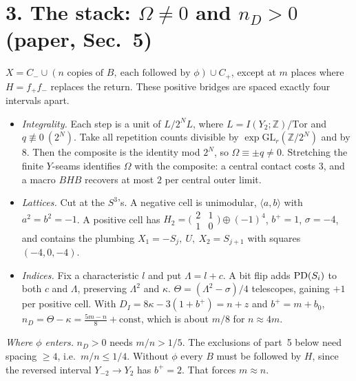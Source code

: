 \documentclass[10pt]{amsart}
\newcommand{\Z}{\mathbb Z}\newcommand{\Q}{\mathbb Q}\newcommand{\F}{\mathbb F}
\begin{document}
\section*{3. The stack: $\Omega\ne0$ and $n_D>0$ (paper, Sec.~5)}
$X=C_-\cup(\text{$n$ copies of }B,\ \text{each followed by }\phi)\cup C_+$,
except at $m$ places where $H=f_+f_-$ replaces the return. These positive
bridges are spaced exactly four intervals apart.
\begin{itemize}
\item \emph{Integrality.} Each step is a unit of $L/2^NL$, where
$L=I(Y_2;\Z)/\mathrm{Tor}$ and $q\not\equiv0\ (2^N)$. Take all repetition
counts divisible by $\exp\mathrm{GL}_r(\Z/2^N)$ and by $8$. Then the composite
is the identity mod $2^N$, so $\Omega\equiv\pm q\ne0$. Stretching the finite
$Y$-seams identifies $\Omega$ with the composite: a central contact costs
$3$, and a macro $BHB$ recovers at most $2$ per central outer limit.
\item \emph{Lattices.} Cut at the $S^3$'s. A negative cell is unimodular,
$\langle a,b\rangle$ with $a^2=b^2=-1$. A positive cell has
$H_2=\bigl(\begin{smallmatrix}2&1\\1&0\end{smallmatrix}\bigr)\oplus(-1)^4$,
$b^+=1$, $\sigma=-4$, and contains the plumbing
$X_1=-S_j,\ U,\ X_2=S_{j+1}$ with squares $(-4,0,-4)$.
\item \emph{Indices.} Fix a characteristic $l$ and put $\Lambda=l+c$. A bit
flip adds $\operatorname{PD}(S_i)$ to both $c$ and $\Lambda$, preserving $\Lambda^2$ and
$\kappa$. $\Theta=(\Lambda^2-\sigma)/4$ telescopes, gaining $+1$ per positive
cell. With $D_I=8\kappa-3(1+b^+)=n+z$ and $b^+=m+b_0$,
$n_D=\Theta-\kappa=\frac{5m-n}{8}+\mathrm{const}$, which is about $m/8$ for $n\approx4m$.
\end{itemize}
\emph{Where $\phi$ enters.} $n_D>0$ needs $m/n>1/5$. The exclusions of
part~5 below need spacing $\ge4$, i.e.\ $m/n\le1/4$. Without $\phi$ every $B$
must be followed by $H$, since the reversed interval
$Y_{-2}\to Y_2$ has $b^+=2$. That forces $m\approx n$.
\end{document}
